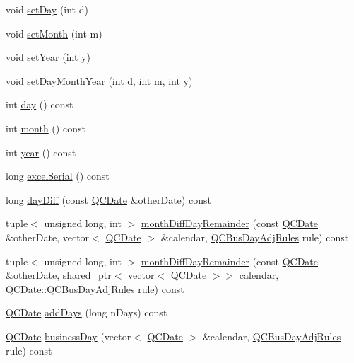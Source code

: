 \begin{DoxyCompactItemize}
void \hyperlink{class_q_c_date_a6f243d10b5e895b831389b695a2ee21f}{set\+Day} (int d)
\item 
void \hyperlink{class_q_c_date_ad6761685c9c092b6a655b53fc09d5075}{set\+Month} (int m)
\item 
void \hyperlink{class_q_c_date_add8aa03f53dca484371467bd67b673f7}{set\+Year} (int y)
\item 
void \hyperlink{class_q_c_date_a83992c0c1735992b1589584ec12bd7f4}{set\+Day\+Month\+Year} (int d, int m, int y)
\item 
int \hyperlink{class_q_c_date_afdd2b7572d223f7295345ce4e3331434}{day} () const 
\item 
int \hyperlink{class_q_c_date_a947dd2de2e8e1f94d17df771a3a2ffd0}{month} () const 
\item 
int \hyperlink{class_q_c_date_a0d2a079ef29c00f5518ccf122aeb5d4d}{year} () const 
\item 
long \hyperlink{class_q_c_date_a91dae9aacdc06dcc3c3aaac686a6a6f7}{excel\+Serial} () const 
\item 
long \hyperlink{class_q_c_date_a1591b1ddccfbaa539c623bd7223685d6}{day\+Diff} (const \hyperlink{class_q_c_date}{Q\+C\+Date} \&other\+Date) const 
\item 
tuple$<$ unsigned long, int $>$ \hyperlink{class_q_c_date_a9100d8c3ba63fd98127b5ddcbfa04f28}{month\+Diff\+Day\+Remainder} (const \hyperlink{class_q_c_date}{Q\+C\+Date} \&other\+Date, vector$<$ \hyperlink{class_q_c_date}{Q\+C\+Date} $>$ \&calendar, \hyperlink{class_q_c_date_a17e5b6c9a1a784f917c8e84045d7e362}{Q\+C\+Bus\+Day\+Adj\+Rules} rule) const 
\item 
tuple$<$ unsigned long, int $>$ \hyperlink{class_q_c_date_ae2dc2722a7a9f6b102320e1a9ef53d6f}{month\+Diff\+Day\+Remainder} (const \hyperlink{class_q_c_date}{Q\+C\+Date} \&other\+Date, shared\+\_\+ptr$<$ vector$<$ \hyperlink{class_q_c_date}{Q\+C\+Date} $>$$>$ calendar, \hyperlink{class_q_c_date_a17e5b6c9a1a784f917c8e84045d7e362}{Q\+C\+Date\+::\+Q\+C\+Bus\+Day\+Adj\+Rules} rule) const 
\item 
\hyperlink{class_q_c_date}{Q\+C\+Date} \hyperlink{class_q_c_date_a3c5f40573c1bd67ac55f1303fbfb1c71}{add\+Days} (long n\+Days) const 
\item 
\hyperlink{class_q_c_date}{Q\+C\+Date} \hyperlink{class_q_c_date_a25b12688ac06d13d3158ca2088204e87}{business\+Day} (vector$<$ \hyperlink{class_q_c_date}{Q\+C\+Date} $>$ \&calendar, \hyperlink{class_q_c_date_a17e5b6c9a1a784f917c8e84045d7e362}{Q\+C\+Bus\+Day\+Adj\+Rules} rule) const 
\item 
$$
\end{DoxyCompactItemize}
